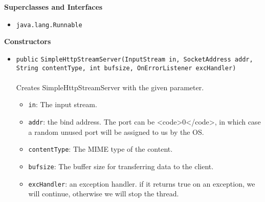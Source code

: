 \textbf{\sffamily Superclasses and Interfaces}
\begin{itemize}
\item \lstinline|java.lang.Runnable|
\end{itemize}


\textbf{\sffamily Constructors}
\begin{itemize}
\item \lstinline|public| \lstinline|SimpleHttpStreamServer|\lstinline|(InputStream in, SocketAddress addr, String contentType, int bufsize, OnErrorListener excHandler)|\\ \\[-0.6em]
Creates SimpleHttpStreamServer with the given parameter.
\begin{itemize}
\item \lstinline|in|: The input stream.
\item \lstinline|addr|: the bind address. The port can be <code>0</code>, in which
 case a random unused port will be assigned to us by the OS.
\item \lstinline|contentType|: The MIME type of the content.
\item \lstinline|bufsize|: The buffer size for transferring data to the client.
\item \lstinline|excHandler|: an exception handler. if it returns true on an exception,
                   we will continue, otherwise we will stop the thread.
\end{itemize}



\end{itemize}


